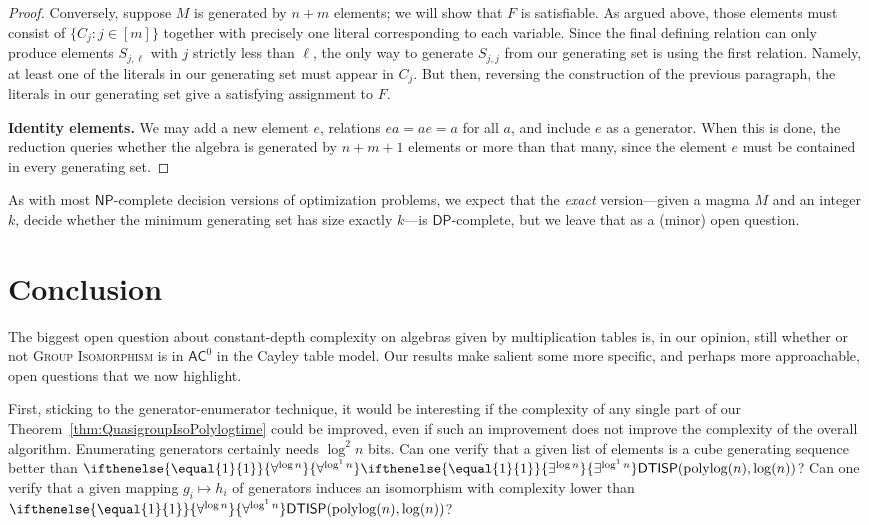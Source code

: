 \documentclass{article}
\newcommand{\algprobm}[1]{\textsc{#1}\xspace}
\newcommand{\betacc}[1]{\ifthenelse{\equal{#1}{1}}{\exists^{\log n}}{\exists^{\log^{#1}n}}} %
\newcommand{\alphacc}[1]{\ifthenelse{\equal{#1}{1}}{\forall^{\log n}}{\forall^{\log^{#1}n}}} %
\newcommand*{\ComplexityClass}[1]{\ensuremath{\mathsf{#1}}\xspace}
\newcommand{\DTISP}{\ComplexityClass{DTISP}}
\newcommand{\DTISPpll}{\ensuremath{\DTISP(\mathrm{polylog}(n),\mathrm{log}(n))}\xspace}
\begin{document}
\begin{proof}
Conversely, suppose $M$ is generated by $n+m$ elements; we will show that $F$ is satisfiable. As argued above, those elements must consist of $\{C_j : j \in [m]\}$ together with precisely one literal corresponding to each variable. Since the final defining relation can only produce elements $S_{j,\ell}$ with $j$ strictly less than $\ell$, the only way to generate $S_{j,j}$ from our generating set is using the first relation. Namely, at least one of the literals in our generating set must appear in $C_j$. But then, reversing the construction of the previous paragraph, the literals in our generating set give a satisfying assignment to $F$. 

\textbf{Identity elements.} We may add a new element $e$, relations $ea = ae = a$ for all $a$, and include $e$ as a generator. When this is done, the reduction queries whether the algebra is generated by $n+m+1$ elements or more than that many, since the element $e$ must be contained in every generating set.
\end{proof}

As with most $\mathsf{NP}$-complete decision versions of optimization problems, we expect that the \emph{exact} version---given a magma $M$ and an integer $k$, decide whether the minimum generating set has size exactly $k$---is $\mathsf{DP}$-complete, but we leave that as a (minor) open question.

\section{Conclusion} \label{sec:conclusion}
The biggest open question about constant-depth complexity on algebras given by multiplication tables is, in our opinion, still whether or not \algprobm{Group Isomorphism} is in $\mathsf{AC}^0$ in the Cayley table model. 
Our results make salient some more specific, and perhaps more approachable, open questions that we now highlight. 

First, sticking to the generator-enumerator technique, it would be interesting if the complexity of any single part of our Theorem~\ref{thm:QuasigroupIsoPolylogtime} could be improved, even if such an improvement does not improve the complexity of the overall algorithm. Enumerating generators certainly needs $\log^2 n$ bits. Can one verify that a given list of elements is a cube generating sequence better than $\alphacc{1} \betacc{1}\DTISPpll$? Can one verify that a given mapping $g_i \mapsto h_i$ of generators induces an isomorphism with complexity lower than $\alphacc{1}\DTISPpll$? 
\end{document}
